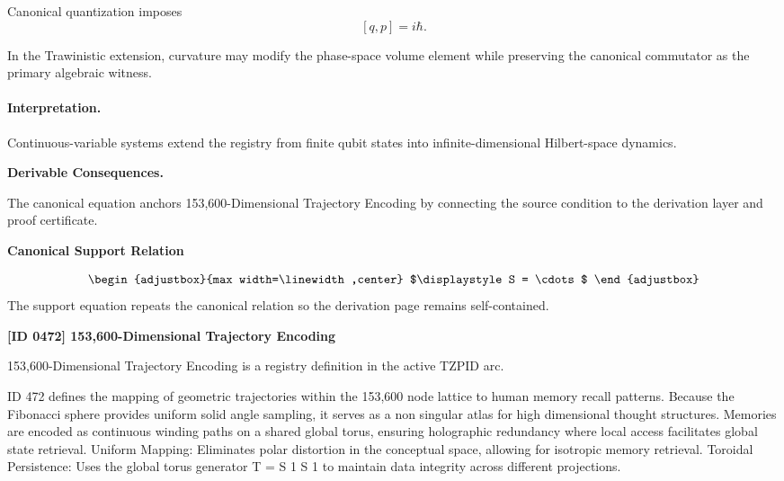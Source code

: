 Canonical quantization imposes
\begin{equation}
\boxed{
[q,p]=i\hbar .
}
\end{equation}

In the Trawinistic extension, curvature may modify the phase-space volume element while preserving the canonical commutator as the primary algebraic witness.

\paragraph{Interpretation.}
Continuous-variable systems extend the registry from finite qubit states into infinite-dimensional Hilbert-space dynamics.

\par\vspace{0.35em}
\noindent\textbf{Derivable Consequences.}\quad
\begingroup
\footnotesize
\raggedright
The canonical equation anchors 153,600-Dimensional Trajectory Encoding by connecting the source condition to the derivation layer and proof certificate.
\par\endgroup

\noindent\textbf{Canonical Support Relation}\par
\[
\begin{adjustbox}{max width=\linewidth,center}
$\displaystyle
S = \cdots
$
\end{adjustbox}
\]
\noindent The support equation repeats the canonical relation so the derivation page remains self-contained.\par

\clearpage
\noindent\textbf{[ID 0472] 153,600-Dimensional Trajectory Encoding}\par
\vspace{0.35em}
\begingroup\small
{}
153,600-Dimensional Trajectory Encoding is a registry definition in the active TZPID arc.

ID 472 defines the mapping of geometric trajectories within the 153,600 node lattice to human memory recall patterns. Because the Fibonacci sphere provides uniform solid angle sampling, it serves as a non singular atlas for high dimensional thought structures. Memories are encoded as continuous winding paths on a shared global torus, ensuring holographic redundancy where local access facilitates global state retrieval. Uniform Mapping: Eliminates polar distortion in the conceptual space, allowing for isotropic memory retrieval. Toroidal Persistence: Uses the global torus generator T = S 1 S 1 to maintain data integrity across different projections.

